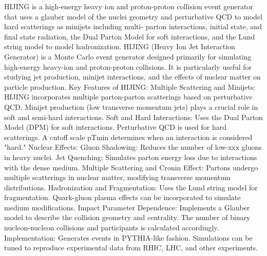 HIJING is a high-energy heavy ion and proton-proton collision event generator that uses a glauber model of the nuclei geometry and perturbative QCD to model hard scatterings as minijets including multi- parton interactions, initial state, and final state radiation, the Dual Parton Model for soft interactions, and the Lund string model to model hadronization. 
HIJING (Heavy Ion Jet Interaction Generator) is a Monte Carlo event generator designed primarily for simulating high-energy heavy-ion and proton-proton collisions. 
It is particularly useful for studying jet production, minijet interactions, and the effects of nuclear matter on particle production.
Key Features of HIJING:
Multiple Scattering and Minijets:
HIJING incorporates multiple parton-parton scatterings based on perturbative QCD.
Minijet production (low transverse momentum jets) plays a crucial role in soft and semi-hard interactions.
Soft and Hard Interactions:
Uses the Dual Parton Model (DPM) for soft interactions.
Perturbative QCD is used for hard scatterings.
A cutoff scale pTmin determines when an interaction is considered "hard."
Nuclear Effects:
Gluon Shadowing: Reduces the number of low-xxx gluons in heavy nuclei.
Jet Quenching: Simulates parton energy loss due to interactions with the dense medium.
Multiple Scattering and Cronin Effect: Partons undergo multiple scatterings in nuclear matter, modifying transverse momentum distributions.
Hadronization and Fragmentation:
Uses the Lund string model for fragmentation.
Quark-gluon plasma effects can be incorporated to simulate medium modifications.
Impact Parameter Dependence:
Implements a Glauber model to describe the collision geometry and centrality.
The number of binary nucleon-nucleon collisions and participants is calculated accordingly.
Implementation:
Generates events in PYTHIA-like fashion.
Simulations can be tuned to reproduce experimental data from RHIC, LHC, and other experiments.

